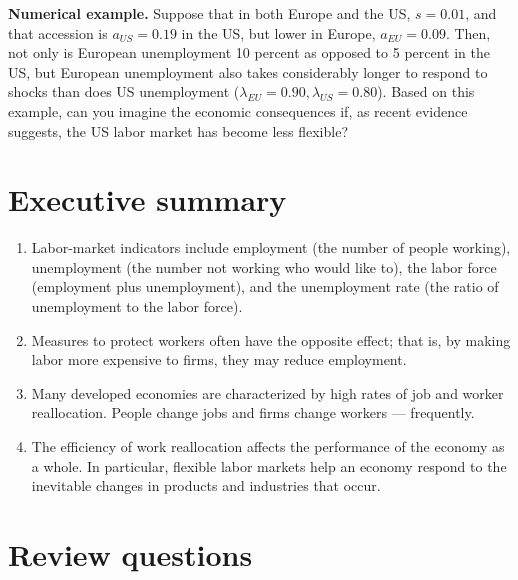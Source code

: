 \textbf{Numerical example.} Suppose that in both Europe and the US, $s=0.01$, and that accession is $a_{US}=0.19$  in the US, but lower in Europe, $a_{EU}=0.09$. Then, not only is European unemployment 10 percent as opposed to 5 percent in the US, but European unemployment also takes considerably longer to respond to shocks than does US unemployment ($\lambda_{EU}=0.90,\lambda_{US}=0.80$). Based on this example, can you imagine the economic consequences if, as recent evidence suggests, the US labor market has become less flexible?



\section*{Executive summary}

\begin{enumerate}
\item Labor-market indicators include employment (the number of
people working), unemployment (the number not working who would
like to), the labor force (employment plus unemployment), and the
unemployment rate (the ratio of unemployment to the labor force).

\item Measures to protect workers often have the opposite effect; that is,
by making labor more expensive to firms, they may reduce employment.

\item Many developed economies are characterized by high rates of job
and worker reallocation. People change jobs and firms change
workers --- frequently.

\item The efficiency of work reallocation affects the performance
of the economy as a whole. In particular, flexible labor markets help an
economy respond to the inevitable changes in products and industries that occur.

\end{enumerate}


\section*{Review questions}

